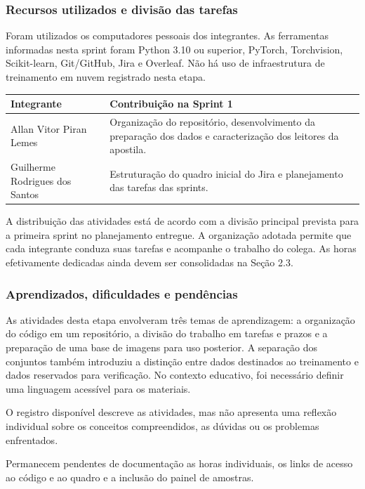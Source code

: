 \documentclass[12pt,a4paper]{article}
\begin{document}
\subsubsection{Recursos utilizados e divisão das tarefas}
Foram utilizados os computadores pessoais dos integrantes. As ferramentas informadas nesta sprint foram Python 3.10 ou superior, PyTorch, Torchvision, Scikit-learn, Git/GitHub, Jira e Overleaf. Não há uso de infraestrutura de treinamento em nuvem registrado nesta etapa.

\begin{center}
\small
\begin{tabularx}{\textwidth}{@{}>{\raggedright\arraybackslash}p{}Y@{}}
\toprule
\textbf{Integrante} & \textbf{Contribuição na Sprint 1} \\
\midrule
Allan Vitor Piran Lemes & Organização do repositório, desenvolvimento da preparação dos dados e caracterização dos leitores da apostila. \\
Guilherme Rodrigues dos Santos & Estruturação do quadro inicial do Jira e planejamento das tarefas das sprints. \\
\bottomrule
\end{tabularx}
\end{center}

A distribuição das atividades está de acordo com a divisão principal prevista para a primeira sprint no planejamento entregue. A organização adotada permite que cada integrante conduza suas tarefas e acompanhe o trabalho do colega. As horas efetivamente dedicadas ainda devem ser consolidadas na Seção 2.3.

\subsubsection{Aprendizados, dificuldades e pendências}
As atividades desta etapa envolveram três temas de aprendizagem: a organização do código em um repositório, a divisão do trabalho em tarefas e prazos e a preparação de uma base de imagens para uso posterior. A separação dos conjuntos também introduziu a distinção entre dados destinados ao treinamento e dados reservados para verificação. No contexto educativo, foi necessário definir uma linguagem acessível para os materiais.

O registro disponível descreve as atividades, mas não apresenta uma reflexão individual sobre os conceitos compreendidos, as dúvidas ou os problemas enfrentados.

Permanecem pendentes de documentação as horas individuais, os links de acesso ao código e ao quadro e a inclusão do painel de amostras.
\end{document}

